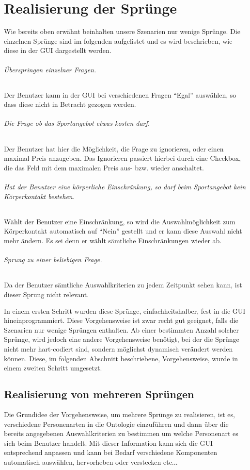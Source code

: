 \chapter{Realisierung der Sprünge}
Wie bereits oben erwähnt beinhalten unsere Szenarien nur wenige Sprünge. Die einzelnen Sprünge sind im folgenden aufgelistet und es wird beschrieben, wie diese in der GUI dargestellt werden. 

\subparagraph{Überspringen einzelner Fragen.} Der Benutzer kann in der GUI bei verschiedenen Fragen "`Egal"' auswählen, so dass diese nicht in Betracht gezogen werden.
\subparagraph{Die Frage ob das Sportangebot etwas kosten darf.} Der Benutzer hat hier die Möglichkeit, die Frage zu ignorieren, oder einen maximal Preis anzugeben. Das Ignorieren passiert hierbei durch eine Checkbox, die das Feld mit dem maximalen Preis aus- bzw. wieder anschaltet.
\subparagraph{Hat der Benutzer eine körperliche Einschränkung, so darf beim Sportangebot kein Körperkontakt bestehen.} Wählt der Benutzer eine Einschränkung, so wird die Auswahlmöglichkeit zum Körperkontakt automatisch auf "`Nein"' gestellt und er kann diese Auswahl nicht mehr ändern. Es sei denn er wählt sämtliche Einschränkungen wieder ab.
\subparagraph{Sprung zu einer beliebigen Frage.} Da der Benutzer sämtliche Auswahlkriterien zu jedem Zeitpunkt sehen kann, ist dieser Sprung nicht relevant.

In einem ersten Schritt wurden diese Sprünge, einfachheitshalber, fest in die GUI hineinprogrammiert. Diese Vorgehensweise ist zwar recht gut geeignet, falls die Szenarien nur wenige Sprüngen enthalten. Ab einer bestimmten Anzahl solcher Sprünge, wird jedoch eine andere Vorgehensweise benötigt, bei der die Sprünge nicht mehr hart-codiert sind, sondern möglichst dynamisch verändert werden können. Diese, im folgenden Abschnitt beschriebene, Vorgehensweise, wurde in einem zweiten Schritt umgesetzt.   

\section{Realisierung von mehreren Sprüngen}

Die Grundidee der Vorgehensweise, um mehrere Sprünge zu realisieren, ist es, verschiedene Personenarten in die Ontologie einzuführen und dann über die bereits angegebenen Auswahlkriterien zu bestimmen um welche Personenart es sich beim Benutzer handelt. Mit dieser Information kann sich die GUI entsprechend anpassen und kann bei Bedarf verschiedene Komponenten automatisch auswählen, hervorheben oder verstecken etc...


